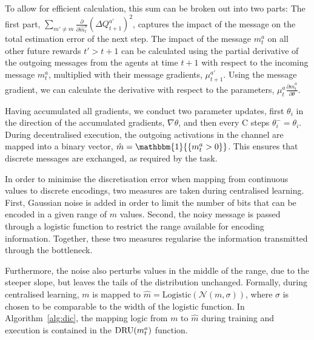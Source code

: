 To allow for efficient calculation, this sum can be broken out into two parts: The first part, $ \sum_{m' \neq m}\frac{\partial }{\partial \hat{m}^a_t}  \left( \Delta Q^{a'}_{t+1} \right)^2 $, captures the impact of the message on the total estimation error of the next step. The impact of the message $m^a_t$ on all other future rewards $t'>t+1$  can be calculated using the partial derivative of the outgoing messages from the agents at time $t+1$ with respect to the incoming message $m^a_t$, multiplied with their message gradients, $\mu^{a'}_{t+1}$. Using the message gradient, we can  calculate the derivative with respect to the parameters,  $\mu ^a_t  \frac{\partial \hat{m}^a_t}{\partial \theta}$. 

Having accumulated all  gradients, we conduct two parameter updates, first $\theta_i$ in the direction of the accumulated gradients, $\nabla \theta$,  and then every C steps  $\theta^-_i  = \theta_i$.  
During decentralised execution, the outgoing activations in the channel are mapped into a binary vector, $\hat{m} = \mathbbm{1}{\{  {m}^{a}_{t} > 0 \}}$. This ensures that discrete messages are exchanged, as required by the task. 

In order to minimise the discretisation error when mapping from continuous values to discrete encodings, two measures are taken during centralised learning. First, Gaussian noise is added in order to limit the number of bits that can be encoded in a given range of $m$ values. Second, the noisy message is passed through a logistic function to restrict the range available for encoding information. Together, these two measures regularise the information transmitted through the bottleneck. 

Furthermore, the noise also perturbs values in the middle of the range, due to the steeper slope, but leaves the tails of the distribution unchanged. Formally, during centralised learning,  $m$ is mapped to $\hat{m} = \text{Logistic}\left(\mathcal{N}(m, \sigma)\right)$, where $\sigma$ is chosen to be comparable to the width of the logistic function. In Algorithm~\ref{alg:dic}, the mapping logic from $m$ to $\hat{m}$ during training and execution is contained in the  $\text{DRU}(m^a_t)$ function.

